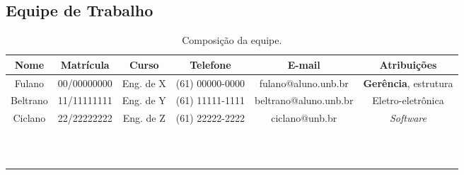 \begin{landscape}

\chapter{Equipe de Trabalho}

\begin{table}[htpb]
\begin{center}
\caption{Composição da equipe.}
\begin{tabular}{|c|c|c|c|c|c|}
\hline
\textbf{Nome} & \textbf{Matrícula} & \textbf{Curso} & \textbf{Telefone} & \textbf{E-mail} & \textbf{Atribuições}\\ \hline
Fulano        & 00/00000000        & Eng. de X      & (61) 00000-0000   & fulano@aluno.unb.br   & \textbf{Gerência}, estrutura\\ \hline
Beltrano      & 11/11111111        & Eng. de Y      & (61) 11111-1111   & beltrano@aluno.unb.br & Eletro-eletrônica \\ \hline
Ciclano       & 22/22222222        & Eng. de Z      & (61) 22222-2222   & ciclano@unb.br        & \textit{Software} \\ \hline
 & & & & &  \\ \hline
 & & & & &  \\ \hline
 & & & & &  \\ \hline
 & & & & &  \\ \hline
 & & & & &  \\ \hline
 & & & & &  \\ \hline
 & & & & &  \\ \hline
 & & & & &  \\ \hline
 & & & & &  \\ \hline
 & & & & &  \\ \hline
 & & & & &  \\ \hline
\end{tabular}
\end{center}
\end{table}


\end{landscape}

